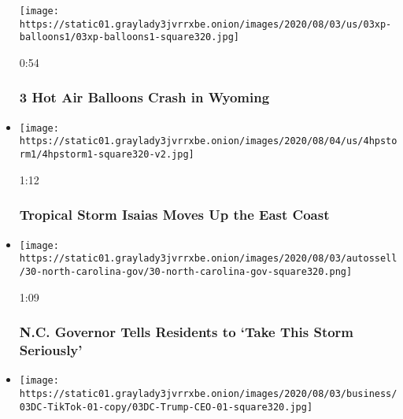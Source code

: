 \begin{itemize}
  \texttt{[image: https://static01.graylady3jvrrxbe.onion/images/2020/08/03/us/03xp-balloons1/03xp-balloons1-square320.jpg]}

  0:54

  \hypertarget{3-hot-air-balloons-crash-in-wyoming}{%
  \subsubsection{3 Hot Air Balloons Crash in
  Wyoming}\label{3-hot-air-balloons-crash-in-wyoming}}
\item
  \href{https://www.nytimes3xbfgragh.onion/video/us/100000007271735/tropical-storm-isaias-carolinas.html?action=click\&module=video-series-bar\&region=header\&pgtype=Article\&playlistId=video/latest-video}{}

  \texttt{[image: https://static01.graylady3jvrrxbe.onion/images/2020/08/04/us/4hpstorm1/4hpstorm1-square320-v2.jpg]}

  1:12

  \hypertarget{tropical-storm-isaias-moves-up-the-east-coast}{%
  \subsubsection{Tropical Storm Isaias Moves Up the East
  Coast}\label{tropical-storm-isaias-moves-up-the-east-coast}}
\item
  \href{https://www.nytimes3xbfgragh.onion/video/us/100000007271090/north-carolina-isaias-coronavirus.html?action=click\&module=video-series-bar\&region=header\&pgtype=Article\&playlistId=video/latest-video}{}

  \texttt{[image: https://static01.graylady3jvrrxbe.onion/images/2020/08/03/autossell/30-north-carolina-gov/30-north-carolina-gov-square320.png]}

  1:09

  \hypertarget{nc-governor-tells-residents-to-take-this-storm-seriously}{%
  \subsubsection{N.C. Governor Tells Residents to `Take This Storm
  Seriously'}\label{nc-governor-tells-residents-to-take-this-storm-seriously}}
\item
  \href{https://www.nytimes3xbfgragh.onion/video/us/100000007270771/trump-tiktok-shutdown-microsoft.html?action=click\&module=video-series-bar\&region=header\&pgtype=Article\&playlistId=video/latest-video}{}

  \texttt{[image: https://static01.graylady3jvrrxbe.onion/images/2020/08/03/business/03DC-TikTok-01-copy/03DC-Trump-CEO-01-square320.jpg]}


\end{itemize}
